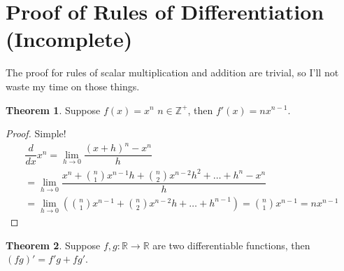 \documentclass{article}
\theoremstyle{definition}
\theoremstyle{definition}
\theoremstyle{definition}
\theoremstyle{definition}
\theoremstyle{definition}
\theoremstyle{definition}
\theoremstyle{definition}
\theoremstyle{definition}
\theoremstyle{definition}
\newtheorem{theorem}{Theorem}[section]
\begin{document}
\section{Proof of Rules of Differentiation (Incomplete)}
The proof for rules of scalar multiplication and addition are trivial, so I'll not waste my time on those things.
\begin{theorem}
Suppose $f(x)=x^n$ $n\in\mathbb{Z}^+$, then $f'(x)=nx^{n-1}$.
\end{theorem}
\begin{proof}
Simple!
\begin{align*}
    \dfrac{d}{dx}x^n=\lim_{h\to0}\dfrac{(x+h)^n-x^n}{h}\\
    =\lim_{h\to0}\dfrac{x^n+\binom{n}{1}x^{n-1}h+\binom{n}{2}x^{n-2}h^2+\ldots+h^n-x^n}{h}\\
    =\lim_{h\to0}(\binom{n}{1}x^{n-1}+\binom{n}{2}x^{n-2}h+\ldots+h^{n-1})
    =\binom{n}{1}x^{n-1}
    =nx^{n-1}
\end{align*}
\end{proof}
\begin{theorem}
Suppose $f,g:\mathbb{R}\to\mathbb{R}$ are two differentiable functions, then $(fg)'=f'g+fg'$.
\end{theorem}
\end{document}
